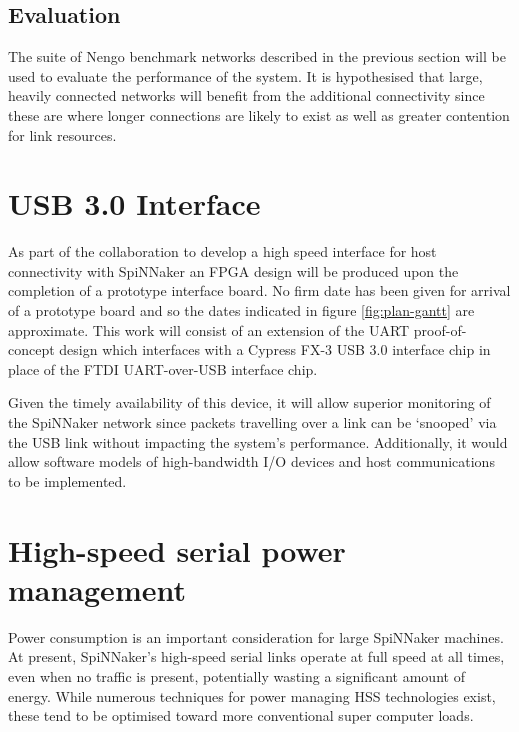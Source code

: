		\subsection{Evaluation}
			
			The suite of Nengo benchmark networks described in the previous section
			will be used to evaluate the performance of the system. It is hypothesised
			that large, heavily connected networks will benefit from the additional
			connectivity since these are where longer connections are likely to exist
			as well as greater contention for link resources.
	
	
	\section{USB 3.0 Interface}
		
		As part of the collaboration to develop a high speed interface for host
		connectivity with SpiNNaker an FPGA design will be produced upon the
		completion of a prototype interface board. No firm date has been given for
		arrival of a prototype board and so the dates indicated in figure
		\ref{fig:plan-gantt} are approximate. This work will consist of an extension
		of the UART proof-of-concept design which interfaces with a Cypress FX-3 USB
		3.0 interface chip in place of the FTDI UART-over-USB interface chip.
		
		Given the timely availability of this device, it will allow superior
		monitoring of the SpiNNaker network since packets travelling over a link can
		be `snooped' via the USB link without impacting the system's performance.
		Additionally, it would allow software models of high-bandwidth I/O devices
		and host communications to be implemented.
	
	
	\section{High-speed serial power management}
		
		
		Power consumption is an important consideration for large SpiNNaker
		machines. At present, SpiNNaker's high-speed serial links operate at full
		speed at all times, even when no traffic is present, potentially wasting a
		significant amount of energy. While numerous techniques for power managing
		HSS technologies exist, these tend to be optimised toward more conventional
		super computer loads.
		
